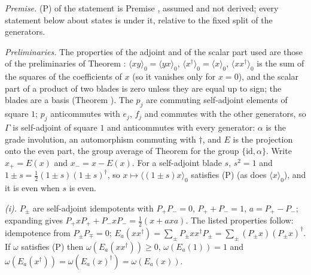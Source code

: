 \emph{Premise.} (P) of the statement is Premise , assumed and not derived; every statement below about states is under it, relative to the fixed split of the generators.

\emph{Preliminaries.} The properties of the adjoint and of the scalar part used are those of the preliminaries of Theorem : $\langle xy\rangle_{0} = \langle yx\rangle_{0}$, $\langle x^{\dagger}\rangle_{0} = \langle x\rangle_{0}$, $\langle xx^{\dagger}\rangle_{0}$ is the sum of the squares of the coefficients of $x$ (so it vanishes only for $x = 0$), and the scalar part of a product of two blades is zero unless they are equal up to sign; the blades are a basis (Theorem ). The $p_{j}$ are commuting self-adjoint elements of square $1$; $p_{j}$ anticommutes with $e_{j}$, $f_{j}$ and commutes with the other generators, so $\Gamma$ is self-adjoint of square $1$ and anticommutes with every generator: $\alpha$ is the grade involution, an automorphism commuting with $\dagger$, and $E$ is the projection onto the even part, the group average of Theorem  for the group $\{\mathrm{id}, \alpha\}$. Write $x_{+} = E(x)$ and $x_{-} = x - E(x)$. For a self-adjoint blade $s$, $s^{2} = 1$ and $1 \pm s = \tfrac12(1 \pm s)(1 \pm s)^{\dagger}$, so $x \mapsto \langle(1 \pm s)x\rangle_{0}$ satisfies (P) (as does $\langle x\rangle_{0}$), and it is even when $s$ is even.

\emph{(i).} $P_{\pm}$ are self-adjoint idempotents with $P_{+}P_{-} = 0$, $P_{+} + P_{-} = 1$, $a = P_{+} - P_{-}$; expanding gives $P_{+}xP_{+} + P_{-}xP_{-} = \tfrac12(x + axa)$. The listed properties follow: idempotence from $P_{\pm}P_{\mp} = 0$; $E_{a}(xx^{\dagger}) = \sum_{\pm}P_{\pm}xx^{\dagger}P_{\pm} = \sum_{\pm}(P_{\pm}x)(P_{\pm}x)^{\dagger}$. If $\omega$ satisfies (P) then $\omega(E_{a}(xx^{\dagger})) \ge 0$, $\omega(E_{a}(1)) = 1$ and $\omega(E_{a}(x^{\dagger})) = \omega(E_{a}(x)^{\dagger}) = \omega(E_{a}(x))$.

